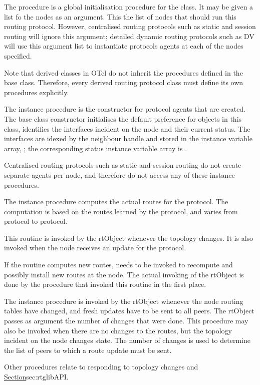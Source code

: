 \begin{list}{---}{}
\item
The procedure
is a global initialisation procedure for the class.
It may be given a list fo the nodes as an argument.
This the list of nodes that should run this routing protocol.
However, centralised routing protocols such as static and session routing
will ignore this argument;
detailed dynamic routing protocols such as DV will use this argument
list to instantiate protocols agents at each of the nodes specified.

Note that derived classes in OTcl do not inherit the procedures
defined in the base class. 
Therefore, every derived routing protocol class must define its own
procedures explicitly.

\item
The instance procedure
is the constructor for protocol agents that are created.
The base class constructor initialises the default preference 
for objects in this class,
identifies the interfaces incident on the node and their current status.
The interfaces are idexed by the neighbour handle and stored in the instance
variable array, ;
the corresponding status instance variable array is .

Centralised routing protocols such as static and session routing do not
create separate agents per node, and therefore do not access any of these
instance procedures.

\item
The instance procedure
computes the actual routes for the protocol.
The computation is based on the routes learned by the protocol, and
varies from protocol to protocol.

This routine is invoked by the rtObject whenever the topology changes.
It is also invoked when the node receives an update for the protocol.

If the routine computes new routes, 
 needs to be invoked
to recompute and possibly install new routes at the node.
The actual invoking of the rtObject is done by the procedure
that invoked this routine in the first place.

\item
The instance procedure
is invoked by the rtObject whenever the node routing tables have changed,
and fresh updates have to be sent to all peers.
The rtObject passes as argument the number of changes that were done.
This procedure may also be invoked when there are no changes to the routes,
but the topology incident on the node changes state.
The number of changes is used to determine the list of peers to which
a route update must be sent.
\end{list}
Other procedures relate to responding to topology changes and
\href{are described later}{Section}{sec:rtglibAPI}.

